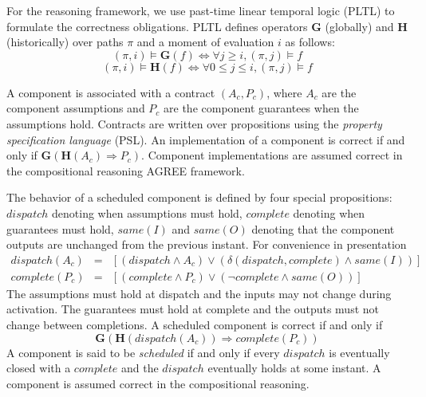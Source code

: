 
\newcommand{\globally}{\ensuremath{\mathbf{G}}}
\newcommand{\historically}{\ensuremath{\mathbf{H}}}
\newcommand{\assumes}{\ensuremath{A}}
\newcommand{\guarantees}{\ensuremath{P}}
\newcommand{\dispatch}{\ensuremath{\mathit{dispatch}}}
\newcommand{\complete}{\ensuremath{\mathit{complete}}}
\newcommand{\same}[1]{\ensuremath{\mathit{same}(#1)}}
\newcommand{\inputs}{\ensuremath{I}}
\newcommand{\outputs}{\ensuremath{O}}
\newcommand{\system}{\ensuremath{S}}
\newcommand{\components}{\ensuremath{C}}
\newcommand{\schedule}{\ensuremath{\phi}}
\newcommand{\valid}{\ensuremath{\mathit{valid}}}

For the reasoning framework, we use past-time linear temporal logic (PLTL) to formulate the correctness obligations.
PLTL defines operators  $\globally$ (globally) and $\historically$ (historically) over paths $\pi$ and a moment of evaluation $i$ as follows:
\begin{equation*}
 (\pi, i) \models \globally(f) \iff \forall j \ge i, (\pi, j) \models f
\end{equation*}
\begin{equation*}
(\pi, i) \models \historically(f) \iff \forall 0 \le j \le i, (\pi, j) \models f
\end{equation*}

A component is associated with a contract $(\assumes_c, \guarantees_c)$, where $\assumes_c$ are the component assumptions and $\guarantees_c$ are the component guarantees when the assumptions hold.
Contracts are written over propositions using the \emph{property specification language} (PSL).
An implementation of a component is correct if and only if $\globally(\historically(\assumes_c) \Rightarrow \guarantees_c)$.
Component implementations are assumed correct in the compositional reasoning AGREE framework.

The behavior of a scheduled component is defined by four special propositions: $\dispatch$ denoting when assumptions must hold, $\complete$ denoting when guarantees must hold, $\same{\inputs}$ and $\same{\outputs}$ denoting that the component outputs are unchanged from the previous instant. For convenience in presentation
\begin{eqnarray*}
  \dispatch(A_c) &=& \left[\left(\dispatch \wedge \assumes_c\right) \vee \left(\delta(\dispatch, \complete) \wedge \same{\inputs}\right)\right] \\
  \complete(P_c) &=& \left[\left(\complete \wedge \guarantees_c\right) \vee \left(\neg\complete \wedge \same{\outputs}\right)\right]
\end{eqnarray*}
The assumptions must hold at dispatch and the inputs may not change during activation.
The guarantees must hold at complete and the outputs must not change between completions.
A scheduled component is correct if and only if
\[
  \globally\left(
    \historically\left(\dispatch(\assumes_c)\right) \Rightarrow \complete(\guarantees_c) \right)
\]
A component is said to be \emph{scheduled} if and only if every $\dispatch$ is eventually closed with a $\complete$ and the $\dispatch$ eventually holds at some instant.
A component is assumed correct in the compositional reasoning.

